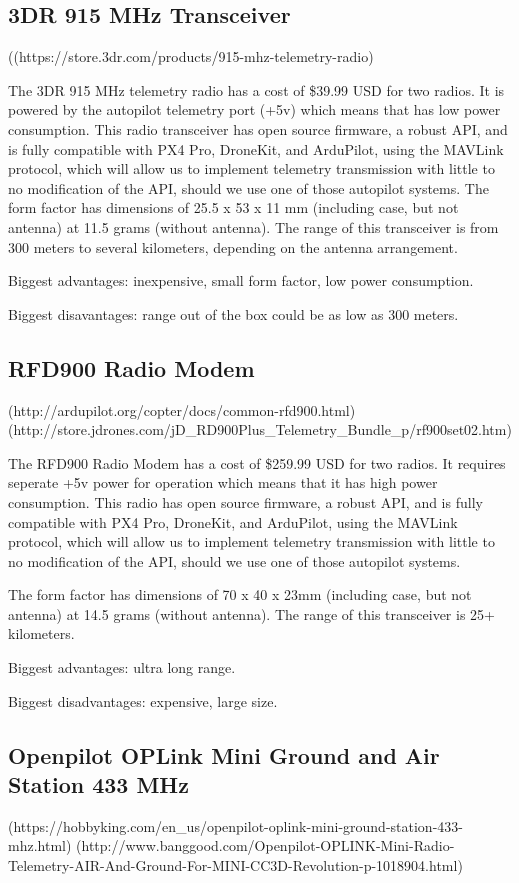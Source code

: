 \documentclass[compsoc,draftclsnofoot,onecolumn,10pt]{IEEEtran}
\begin{document}
\subsection{3DR 915 MHz Transceiver}  ((https://store.3dr.com/products/915-mhz-telemetry-radio)\par

The 3DR 915 MHz telemetry radio has a cost of \$39.99 USD for two radios. It is
powered by the autopilot telemetry port (+5v) which means that has low power
consumption. This radio transceiver has open source firmware, a robust API,
and is fully compatible with PX4 Pro, DroneKit, and ArduPilot, using the
MAVLink protocol, which will allow us to implement telemetry transmission with
little to no modification of the API, should we use one of those autopilot
systems.
The form factor has dimensions of 25.5 x 53 x 11 mm (including case, but not
antenna) at 11.5 grams (without antenna).
The range of this transceiver is from 300 meters to several kilometers,
depending on the antenna arrangement.

Biggest advantages: inexpensive, small form factor, low power consumption.

Biggest disavantages: range out of the box could be as low as 300 meters.


\subsection{RFD900 Radio Modem}
(http://ardupilot.org/copter/docs/common-rfd900.html)(http://store.jdrones.com/jD\_RD900Plus\_Telemetry\_Bundle\_p/rf900set02.htm)\par

The RFD900 Radio Modem has a cost of \$259.99 USD for two radios. It requires
seperate +5v power for operation which means that it has high power
consumption. This radio has open source firmware, a robust API, and is fully
compatible with PX4 Pro, DroneKit, and ArduPilot, using the MAVLink protocol,
which will allow us to implement telemetry transmission with little to no
modification of the API, should we use one of those autopilot systems.

The form factor has dimensions of 70 x 40 x 23mm (including case, but not
antenna) at 14.5 grams (without
antenna).
The range of this transceiver is 25+ kilometers.

Biggest advantages: ultra long range.

Biggest disadvantages: expensive, large size.

\subsection{Openpilot OPLink Mini Ground and Air Station 433 MHz}
(https://hobbyking.com/en\_us/openpilot-oplink-mini-ground-station-433-mhz.html)
(http://www.banggood.com/Openpilot-OPLINK-Mini-Radio-Telemetry-AIR-And-Ground-For-MINI-CC3D-Revolution-p-1018904.html)\par
\end{document}
